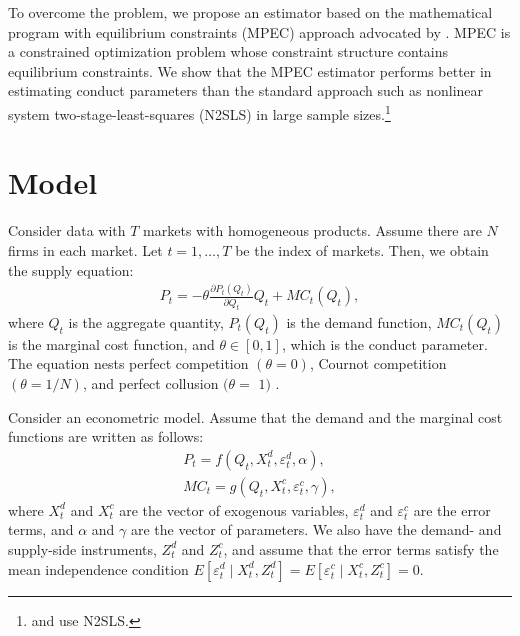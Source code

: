 \documentclass[11pt, a4paper]{article}
\begin{document}
To overcome the problem, we propose an estimator based on the mathematical program with equilibrium constraints (MPEC) approach advocated by \cite{su2012constrained}. 
MPEC is a constrained optimization problem whose constraint structure contains equilibrium constraints. 
We show that the MPEC estimator performs better in estimating conduct parameters than the standard approach such as nonlinear system two-stage-least-squares (N2SLS) in large sample sizes.\footnote{\cite{merel2009measuring} and \cite{okazaki2022excess} use N2SLS.}


\section{Model}
Consider data with $T$ markets with homogeneous products.
Assume there are $N$ firms in each market.
Let $t = 1,\ldots, T$ be the index of markets.
Then, we obtain the supply equation:
\begin{align}
     P_t = -\theta\frac{\partial P_t(Q_{t})}{\partial Q_{t}}Q_{t} + MC_t(Q_{t}),\label{eq:supply_equation}
\end{align}
where $Q_{t}$ is the aggregate quantity, $P_t(Q_{t})$ is the demand function, $MC_{t}(Q_{t})$ is the marginal cost function, and $\theta\in[0,1]$, which is the conduct parameter. 
The equation nests perfect competition $(\theta=0)$, Cournot competition $(\theta=1 / N)$, and perfect collusion $(\theta=$ $1)$ \citep{bresnahan1982oligopoly}.

Consider an econometric model.
Assume that the demand and the marginal cost functions are written as follows: 
\begin{align*}
    P_t = f(Q_{t}, X^{d}_{t}, \varepsilon^{d}_{t}, \alpha), %
    \\
    MC_t = g(Q_{t}, X^{c}_{t}, \varepsilon^{c}_{t}, \gamma),%
\end{align*}
where $X^{d}_{t}$ and $X^{c}_{t}$ are the vector of exogenous variables, $\varepsilon^{d}_{t}$ and $\varepsilon^{c}_{t}$ are the error terms, and $\alpha$ and $\gamma$ are the vector of parameters.
We also have the demand- and supply-side instruments, $Z^{d}_{t}$ and $Z^{c}_{t}$, and assume that the error terms satisfy the mean independence condition $E[\varepsilon^{d}_{t}\mid X^{d}_{t}, Z^{d}_{t}] = E[\varepsilon^{c}_{t} \mid X^{c}_{t}, Z^{c}_{t}] =0$. 
\end{document}
